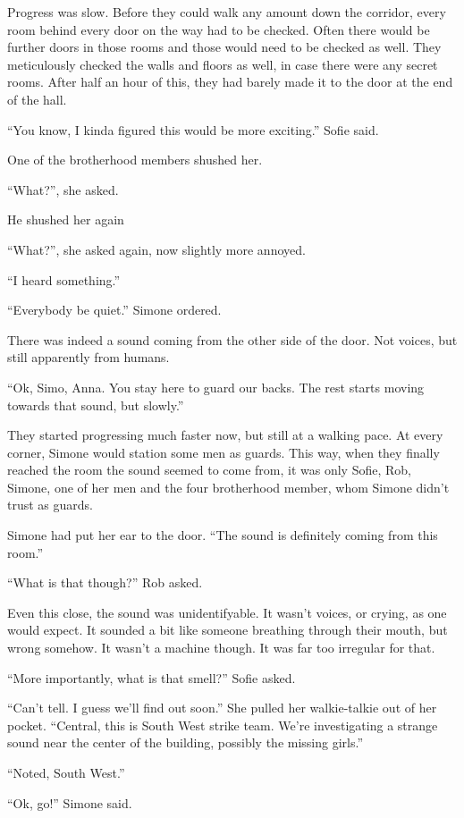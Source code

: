 \documentclass[letterpaper,12pt]{report}
\begin{document}
Progress was slow. Before they could walk any amount down the corridor, every room behind every door on the way had to be checked. Often there would be further doors in those rooms and those would need to be checked as well. They meticulously checked the walls and floors as well, in case there were any secret rooms. After half an hour of this, they had barely made it to the door at the end of the hall.

``You know, I kinda figured this would be more exciting.'' Sofie said.

One of the brotherhood members shushed her.

``What?'', she asked.

He shushed her again

``What?'', she asked again, now slightly more annoyed.

``I heard something.''

``Everybody be quiet.'' Simone ordered.

There was indeed a sound coming from the other side of the door. Not voices, but still apparently from humans.

``Ok, Simo, Anna. You stay here to guard our backs. The rest starts moving towards that sound, but slowly.''

They started progressing much faster now, but still at a walking pace. At every corner, Simone would station some men as guards. This way, when they finally reached the room the sound seemed to come from, it was only Sofie, Rob, Simone, one of her men and the four brotherhood member, whom Simone didn't trust as guards.

Simone had put her ear to the door. ``The sound is definitely coming from this room.''

``What is that though?'' Rob asked.

Even this close, the sound was unidentifyable. It wasn't voices, or crying, as one would expect. It sounded a bit like someone breathing through their mouth, but wrong somehow. It wasn't a machine though. It was far too irregular for that.

``More importantly, what is that smell?'' Sofie asked.

``Can't tell. I guess we'll find out soon.'' She pulled her walkie-talkie out of her pocket. ``Central, this is South West strike team. We're investigating a strange sound near the center of the building, possibly the missing girls.''

``Noted, South West.''

``Ok, go!'' Simone said.
\end{document}
